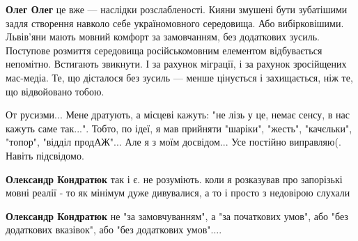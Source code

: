 \begin{itemize}
\begin{itemize}
 
\textbf{Олег Олег} це вже — наслідки розслабленості. Кияни змушені бути
зубатішими задля створення навколо себе україномовного середовища. Або
вибірковішими. Львів'яни мають мовний комфорт за замовчанням, без додаткових
зусиль. Поступове розмиття середовища російськомовним елементом відбувається
непомітно. Встигають звикнути. І за рахунок міграції, і за рахунок зросійщених
мас-медіа. Те, що дісталося без зусиль — менше цінується і захищається, ніж те,
що відвойовано тобою.

 

От русизми... Мене дратують, а місцеві кажуть: "не лізь у це, немає сенсу, в
нас кажуть саме так...". Тобто, по ідеї, я мав прийняти "шаріки", "жесть",
"качєльки", "топор", "відділ продАЖ"... Але я з моїм досвідом... Усе постійно
виправляю(. Навіть підсвідомо.


 
\textbf{Олександр Кондратюк} так і є. не розуміють. коли я розказував про
запорізькі мовні реалії - то як мінімум дуже дивувалися, а то і просто з
недовірою слухали

 
\textbf{Олександр Кондратюк} не "за замовчуванням", а "за початкових умов", або "без додаткових вказівок", або "без додаткових умов"....

 

\end{itemize}
\end{itemize}
